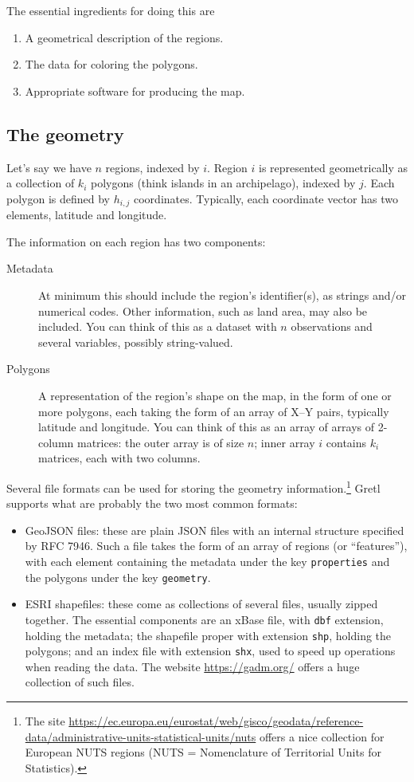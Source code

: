 \documentclass{article}
\begin{document}
The essential ingredients for doing this are
\begin{enumerate}
   \item A geometrical description of the regions.
   \item The data for coloring the polygons.
   \item Appropriate software for producing the map.
\end{enumerate}

\subsection{The geometry}
\label{sec:geometry}

Let's say we have $n$ regions, indexed by $i$. Region $i$ is
represented geometrically as a collection of $k_i$ polygons (think
islands in an archipelago), indexed by $j$. Each polygon is defined by
$h_{i,j}$ coordinates. Typically, each coordinate vector has two
elements, latitude and longitude.

The information on each region has two components:
\begin{description}
\item[Metadata] At minimum this should include the region's
  identifier(s), as strings and/or numerical codes. Other information,
  such as land area, may also be included. You can think of this as a
  dataset with $n$ observations and several variables, possibly
  string-valued.
\item[Polygons] A representation of the region's shape on the map, in
  the form of one or more polygons, each taking the form of an array
  of X--Y pairs, typically latitude and longitude. You can think of
  this as an array of arrays of 2-column matrices: the outer array is
  of size $n$; inner array $i$ contains $k_i$ matrices, each with two
  columns.
\end{description}

Several file formats can be used for storing the geometry
information.\footnote{The site
\url{https://ec.europa.eu/eurostat/web/gisco/geodata/reference-data/administrative-units-statistical-units/nuts}
offers a nice collection for European NUTS regions (NUTS =
Nomenclature of Territorial Units for Statistics).}
Gretl supports what are probably the two most common formats:
\begin{itemize}
\item GeoJSON files: these are plain JSON files with an internal
  structure specified by RFC 7946. Such a file takes the form of an
  array of regions (or ``features''), with each element containing the
  metadata under the key \texttt{properties} and the polygons under
  the key \texttt{geometry}.
\item ESRI shapefiles: these come as collections of several files,
  usually zipped together. The essential components are an
  \textsf{xBase} file, with \texttt{dbf} extension, holding the
  metadata; the shapefile proper with extension \texttt{shp}, holding
  the polygons; and an index file with extension \texttt{shx}, used to
  speed up operations when reading the data. The website
  \url{https://gadm.org/} offers a huge collection of such files.
\end{itemize}
\end{document}
